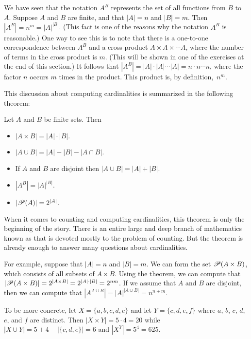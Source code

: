 We have seen that
the notation $A^B$ represents the set of all functions from $B$ to~$A$.
Suppose $A$ and $B$ are finite, and that $|A|=n$ and $|B|=m$.
Then $\left|A^B\right|=n^m=|A|^{|B|}$.  (This fact is one of the
reasons why the notation $A^B$ is reasonable.)
One way to see this is to note that there is a one-to-one correspondence
between $A^B$ and a cross product $A\times A\times\cdots A$, where the
number of terms in the cross product is $m$.  (This will be shown in
one of the exercises at the end of this section.)  It follows that
$\left|A^B\right|=|A|\cdot|A|\cdots|A|=n\cdot n\cdots n$, where the 
factor $n$ occurs $m$ times in the product.  This product is,
by definition,~$n^m$.   
  

This discussion about computing cardinalities is summarized in the following
theorem:
\begin{theorem}
Let $A$ and $B$ be finite sets.  Then
\begin{itemize}
   \item $|A\times B|=|A|\cdot |B|$.
   
   \item $|A\cup B|= |A|+|B|-|A\cap B|$.
   
   \item If $A$ and $B$ are disjoint then $|A\cup B|= |A|+|B|$.
   
   \item $\left|A^B\right|=|A|^{|B|}$.
   
   \item $|{\mathscr P}(A)|=2^{|A|}$.
\end{itemize}
\end{theorem}
When it comes to counting and computing cardinalities, this theorem is
only the beginning of the story.  There is an entire large and deep branch of
mathematics known as  that is devoted mostly to the problem
of counting.  But the theorem is already enough to answer many questions
about cardinalities.

For example, suppose that $|A|=n$ and $|B|=m$.  We can form the set
${\mathscr P}(A\times B)$, which consists of all subsets of $A\times B$.  Using
the theorem, we can compute that $|{\mathscr P}(A\times B)|=2^{|A\times B|}=2^{|A|\cdot|B|}=2^{nm}$.
If we assume that $A$ and $B$ are disjoint, then we can compute that
$\left|A^{A\cup B}\right|=|A|^{|A\cup B|}=n^{n+m}$.

To be more concrete, let $X=\{a,b,c,d,e\}$ and let
$Y=\{c,d,e,f\}$ where $a$, $b$, $c$, $d$, $e$, and $f$ are distinct.
Then $|X\times Y|=5\cdot 4=20$ while $|X\cup Y|=5 + 4 - |\{c,d,e\}| = 6$
and $\left|X^Y\right|=5^4=625$.


